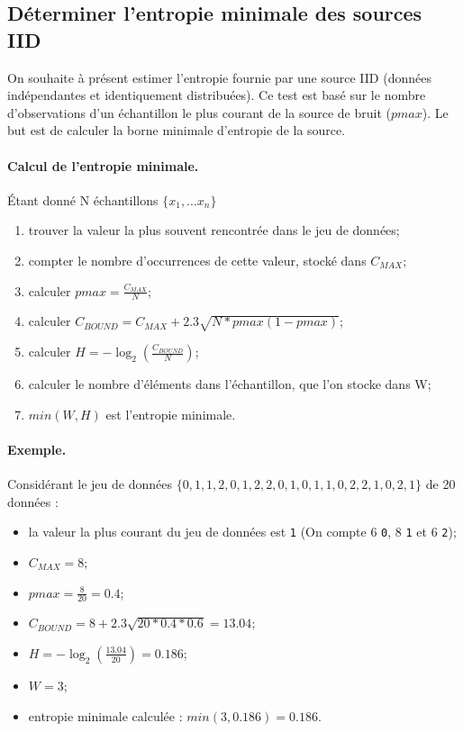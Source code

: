 \subsection{Déterminer l'entropie minimale des sources IID}
On souhaite à présent estimer l'entropie fournie par une source IID (données indépendantes et identiquement distribuées). 
Ce test est basé sur le nombre d'observations d'un échantillon le plus courant de la source de bruit ($pmax$). Le but est de calculer la borne minimale d'entropie de la source.\\

\paragraph{Calcul de l'entropie minimale.\\}
Étant donné N échantillons $\lbrace x_1, ... x_n \rbrace$
\begin{enumerate}
\item trouver la valeur la plus souvent rencontrée dans le jeu de données;
\item compter le nombre d’occurrences de cette valeur, stocké dans $C_{MAX}$;
\item calculer $pmax= \frac{C_{MAX}}{N}$;
\item calculer $C_{BOUND} = C_{MAX} + 2.3 \sqrt{N*pmax(1-pmax)} $;
\item calculer $ H = -\log_2(\frac{C_{BOUND}}{N})$;
\item calculer le nombre d'éléments dans l'échantillon, que l'on stocke dans W;
\item $min(W,H)$ est l'entropie minimale.\\
\end{enumerate}


\paragraph{Exemple.\\}
Considérant le jeu de données $\lbrace 0,1,1,2,0,1,2,2,0,1,0,1,1,0,2,2,1,0,2,1 \rbrace$ de 20 données :
\begin{itemize}
\item la valeur la plus courant du jeu de données est \texttt{1} (On compte 6 \texttt{0}, 8 \texttt{1} et 6 \texttt{2});
\item $C_{MAX} = 8$;
\item $pmax = \frac{8}{20} = 0.4$;
\item $ C_{BOUND} = 8 + 2.3 \sqrt{20*0.4*0.6} = 13.04$;
\item $ H = -\log_2(\frac{13.04}{20}) = 0.186$;
\item $ W = 3$;
\item entropie minimale calculée : $ min(3,0.186) = 0.186$.\\
\end{itemize}

